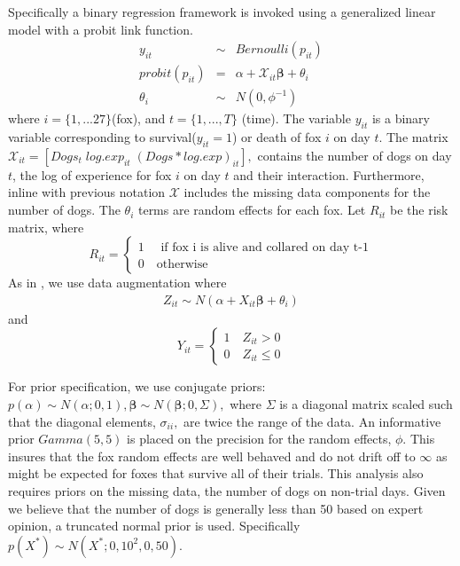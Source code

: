 \documentclass[aoas,preprint]{imsart}
\numberwithin{equation}{section}
\theoremstyle{plain}
\begin{document}
Specifically a binary regression framework is invoked using a generalized linear model with a probit link function.
\begin{eqnarray}
y_{it} &\sim& Bernoulli(p_{it}) \\
probit(p_{it}) & = & \alpha + \mathcal{X}_{it}\boldsymbol{\beta} + \theta_{i} \\
\theta_{i} &\sim& N(0, \phi^{-1})
\end{eqnarray}
where $i = \{1,...27\} $(fox), and $t= \{1,...,T\}$ (time). The variable $y_{it}$ is a binary variable corresponding to survival($y_{it}=1$) or death of fox $i$ on day $t$. The matrix $\mathcal{X}_{it} = [Dogs_t\; log.exp_{it}\; (Dogs*log.exp)_{it}],$ contains the number of dogs on day $t$, the log of experience for fox $i$ on day $t$ and their interaction. Furthermore, inline with previous notation $\mathcal{X}$ includes the missing data components for the number of dogs. The $\theta_i$ terms are random effects for each fox. Let $R_{it}$ be the risk matrix, where
\[
    R_{it}=\left\{
                \begin{array}{ll}
                  1 \quad \text{ if fox i is alive and collared on day t-1}\\
                  0 \quad \text{otherwise}
                \end{array}
              \right.
  \]
  As in \cite{albert}, we use data augmentation where 
  \begin{eqnarray}
  Z_{it} \sim N( \alpha + X_{it}\boldsymbol{\beta} +\theta_{i})
  \end{eqnarray}
  and
\[
    Y_{it}=\left\{
                \begin{array}{ll}
                  1 \quad  Z_{it} > 0\\
                  0 \quad Z_{it} \leq 0
                \end{array}
              \right.
  \]
  
  For prior specification, we use conjugate priors: $p(\alpha) \sim N(\alpha;0,1), \boldsymbol{\beta} \sim N(\boldsymbol{\beta};0,\Sigma),$ where $\Sigma$ is a diagonal matrix scaled such that the diagonal elements, $\sigma_{ii},$ are twice the range of the data. An informative prior $Gamma(5,5)$ is placed on the precision for the random effects, $\phi$. This insures that the fox random effects are well behaved and do not drift off to $\infty$ as might be expected for foxes that survive all of their trials. This analysis also requires priors on the missing data, the number of dogs on non-trial days. Given we believe that the number of dogs is generally less than 50 based on expert opinion, a truncated normal prior is used. Specifically $p(X^{*}) \sim N(X^{*}; 0 ,10^2,0,50)$.
  
\end{document}
